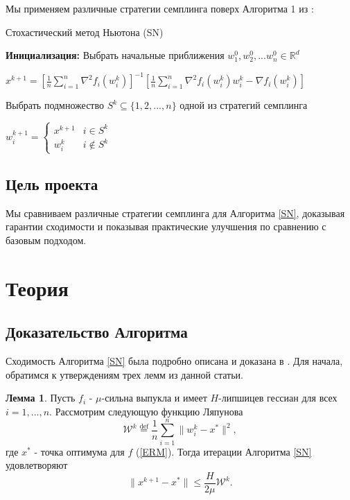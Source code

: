 \documentclass{article}
\theoremstyle{definition}
\theoremstyle{assumption}
\theoremstyle{lemma}
\newtheorem{lemma}{Лемма}
\theoremstyle{theorem}
\theoremstyle{proposition}
\begin{document}
	Мы применяем различные стратегии семплинга поверх Алгоритма 1 из \cite{kovalev2019stochastic}:
	
	\begin{algorithm}
		\caption{Стохастический метод Ньютона (SN)}\label{SN}
		\begin{algorithmic}
			\item \textbf{Инициализация:} Выбрать начальные приближения $w_1^0, w_2^0, ... w_n^0 \in \mathbb R^d$
			
			\item {}	
			
			$ x^{k+1} = \left[ \frac{1}{n} \sum \limits_{i=1}^n \nabla^2 f_i(w_i^k) \right]^{-1} \left[ \frac{1}{n} \sum \limits_{i=1}^n \nabla^2 f_i(w_i^k) w_i^k - \nabla f_i(w_i^k) \right] $
			
			Выбрать подмножество $S^k \subseteq \{ 1, 2, ..., n \}$ одной из стратегий семплинга
			
			$w_i^{k+1} = 
			\begin{cases}
				x^{k+1} & i \in S^k \\
				w_i^k & i \notin S^k
			\end{cases}$
			
			\item \EndFor
		\end{algorithmic}
	\end{algorithm}
	
	\subsection{Цель проекта}
	
	Мы сравниваем различные стратегии семплинга для Алгоритма \ref{SN}, доказывая гарантии сходимости и показывая практические улучшения по сравнению с базовым подходом.
	
	
	\section{Теория}	
	
	\subsection{Доказательство Алгоритма}
	
	Сходимость Алгоритма \ref{SN} была подробно описана и доказана в \cite{kovalev2019stochastic}. Для начала, обратимся к утверждениям трех лемм из данной статьи.
	
	\begin{lemma}\label{lemma:1}
		Пусть $f_i$ - $\mu$-сильна выпукла и имеет $H$-липшицев гессиан для всех $i = 1,...,n$. Рассмотрим следующую функцию Ляпунова
		\begin{equation}
			\mathcal W^k \overset{\text{def}} = \frac{1}{n} \sum \limits_{i=1}^n \| w_i^k - x^* \|^2,
		\end{equation}
		где $x^*$ - точка оптимума для $f$ (\ref{ERM}). Тогда итерации Алгоритма \ref{SN} удовлетворяют
		\begin{equation}
			\|x^{k+1} - x^*\| \leqslant \frac{H}{2 \mu} \mathcal W^k.
		\end{equation}
	\end{lemma}
	
\end{document}
